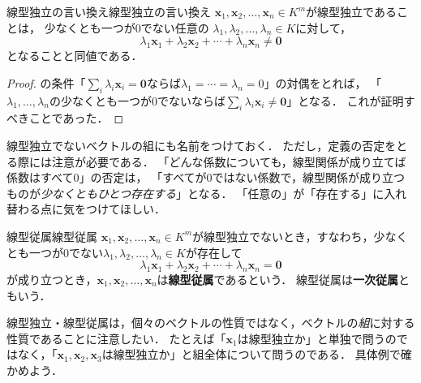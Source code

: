\begin{prop}{線型独立の言い換え}{線型独立の言い換え}
  $\bm{x}_1,\bm{x}_2,\dots,\bm{x}_n\in K^m$が線型独立であることは，
  少なくとも一つが$0$でない任意の
  $\lambda_1,\lambda_2,\dots,\lambda_n\in K$に対して，
  \[
    \lambda_1\bm{x}_1+\lambda_2\bm{x}_2+\cdots
    +\lambda_n\bm{x}_n\ne\bm{0}
  \]
  となることと同値である．
\end{prop}

\begin{tleftbar}
\begin{proof}
  の条件「$\sum_i \lambda_i \bm{x}_i = \bm{0}$ならば$\lambda_1 = \cdots = \lambda_n = 0$」の対偶をとれば，
  「$\lambda_1, \dots, \lambda_n$の少なくとも一つが$0$でないならば$\sum_i \lambda_i \bm{x}_i \ne \bm{0}$」となる．
  これが証明すべきことであった．
\end{proof}
\end{tleftbar}

線型独立でないベクトルの組にも名前をつけておく．
ただし，定義の否定をとる際には注意が必要である．
「どんな係数についても，線型関係が成り立てば係数はすべて$0$」の否定は，
「すべてが$0$ではない係数で，線型関係が成り立つものが\emph{少なくともひとつ存在する}」となる．
「任意の」が「存在する」に入れ替わる点に気をつけてほしい．

\begin{definition}{線型従属}{線型従属}
  $\bm{x}_1, \bm{x}_2, \dots, \bm{x}_n \in K^m$が線型独立でないとき，すなわち，少なくとも一つが$0$でない$\lambda_1, \lambda_2, \dots, \lambda_n \in K$が存在して
  \[
    \lambda_1 \bm{x}_1 + \lambda_2 \bm{x}_2 + \cdots + \lambda_n \bm{x}_n = \bm{0}
  \]
  が成り立つとき，$\bm{x}_1, \bm{x}_2, \dots, \bm{x}_n$は\textbf{線型従属}であるという．
  線型従属は\textbf{一次従属}ともいう．
\end{definition}

線型独立・線型従属は，個々のベクトルの性質ではなく，ベクトルの\emph{組}に対する性質であることに注意したい．
たとえば「$\bm{x}_1$は線型独立か」と単独で問うのではなく，「$\bm{x}_1, \bm{x}_2, \bm{x}_3$は線型独立か」と組全体について問うのである．
具体例で確かめよう．

